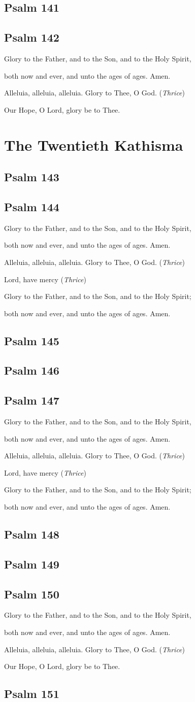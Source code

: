 \documentclass[12pt,openany]{book}
\newcommand{\kathismabreak}{
  \medskip
  \begin{center}
  \begin{footnotesize}
  Glory to the Father, and to the Son, and to the Holy Spirit,
  
  both now and ever, and unto the ages of ages. Amen.

  Alleluia, alleluia, alleluia. Glory to Thee, O God. (\textit{Thrice})

  Lord, have mercy (\textit{Thrice})

  Glory to the Father, and to the Son, and to the Holy Spirit;
  
  both now and ever, and unto the ages of ages. Amen.
  \end{footnotesize}
  \end{center}
  \smallbreak
}
\newcommand{\kathismaend}{
  \medskip
  \begin{center}
  \begin{footnotesize}
  Glory to the Father, and to the Son, and to the Holy Spirit,
  
  both now and ever, and unto the ages of ages. Amen.

  Alleluia, alleluia, alleluia. Glory to Thee, O God. (\textit{Thrice})

  Our Hope, O Lord, glory be to Thee.
  \end{footnotesize}
  \end{center}
  \smallbreak
}
\begin{document}
\section{Psalm 141}

\smallskip
\section{Psalm 142}


\kathismaend

\chapter*{The Twentieth Kathisma}
\smallskip
\section{Psalm 143}

\smallskip
\section{Psalm 144}


\kathismabreak
\bigskip
\section{Psalm 145}

\smallskip
\pagebreak %
\section{Psalm 146}

\smallskip
\section{Psalm 147}


\kathismabreak
\smallskip
\section{Psalm 148}

\smallskip
\section{Psalm 149}

\smallskip
\section{Psalm 150}


\kathismaend
\smallskip
\section{Psalm 151}


\newpage

\thispagestyle{empty}
\ %

\newpage

\newpage
\pagestyle{plain}
\tableofcontents
\end{document}
